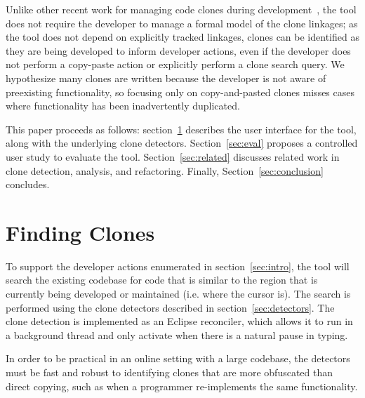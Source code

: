 \documentclass[preprint,10pt]{sigplanconf}
\begin{document}
Unlike other recent work for managing code clones during
development~\cite{deWit2009, Duala-Ekoko2007}, the tool does not
require the developer to manage a formal model of the clone linkages;
as the tool does not depend on explicitly tracked linkages, clones can
be identified as they are being developed to inform developer actions,
even if the developer does not perform a copy-paste action or
explicitly perform a clone search query.  We hypothesize many clones 
are written because the developer is not aware of preexisting functionality,
 so focusing only on copy-and-pasted clones
misses cases where functionality has been inadvertently 
duplicated.

This paper proceeds as follows: section~\ref{sec:finding-clones}
describes the user interface for the tool, along with the underlying
clone detectors. Section~\ref{sec:eval} proposes a controlled user
study to evaluate the tool. Section~\ref{sec:related} discusses
related work in clone detection, analysis, and refactoring. Finally,
Section~\ref{sec:conclusion} concludes.

\section{Finding Clones}
\label{sec:finding-clones}



To support the developer actions enumerated in section~\ref{sec:intro},
the tool will search the existing codebase for code
that is similar to the region that is currently being developed or maintained
(i.e. where the cursor is). The search is performed using the clone detectors
described in section~\ref{sec:detectors}. The clone detection is implemented as
an Eclipse reconciler, which allows it to run in a background thread and only activate 
when there is a natural pause in typing.

In order to be practical in an online
setting with a large codebase, the detectors must be
fast and
robust to identifying clones that are more obfuscated than direct
copying, such as when a programmer re-implements the same
functionality.
\end{document}
